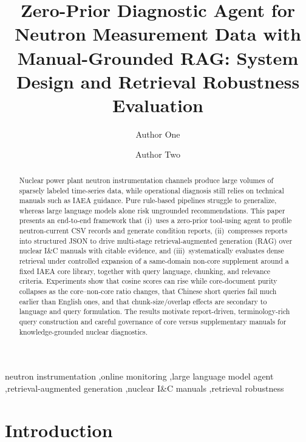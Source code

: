 \documentclass[preprint,12pt,authoryear]{elsarticle}
\begin{document}
\begin{frontmatter}

\title{Zero-Prior Diagnostic Agent for Neutron Measurement Data with Manual-Grounded RAG: System Design and Retrieval Robustness Evaluation}

\author[addr1]{Author One}
\author[addr1]{Author Two}

\address[addr1]{Affiliation, City, Country}

\begin{abstract}
Nuclear power plant neutron instrumentation channels produce large volumes of sparsely labeled time-series data, while operational diagnosis still relies on technical manuals such as IAEA guidance. Pure rule-based pipelines struggle to generalize, whereas large language models alone risk ungrounded recommendations. This paper presents an end-to-end framework that (i)~uses a zero-prior tool-using agent to profile neutron-current CSV records and generate condition reports, (ii)~compresses reports into structured JSON to drive multi-stage retrieval-augmented generation (RAG) over nuclear I\&C manuals with citable evidence, and (iii)~systematically evaluates dense retrieval under controlled expansion of a same-domain non-core supplement around a fixed IAEA core library, together with query language, chunking, and relevance criteria. Experiments show that cosine scores can rise while core-document purity collapses as the core--non-core ratio changes, that Chinese short queries fail much earlier than English ones, and that chunk-size/overlap effects are secondary to language and query formulation. The results motivate report-driven, terminology-rich query construction and careful governance of core versus supplementary manuals for knowledge-grounded nuclear diagnostics.
\end{abstract}

\begin{keyword}
neutron instrumentation \sep online monitoring \sep large language model agent \sep retrieval-augmented generation \sep nuclear I\&C manuals \sep retrieval robustness
\end{keyword}

\end{frontmatter}


\section{Introduction}
\label{sec:intro}

\end{document}
